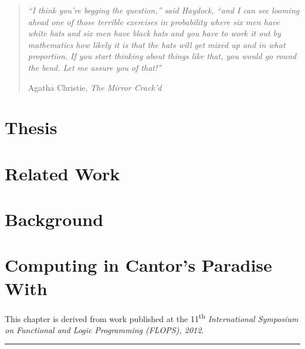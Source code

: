 \documentclass[phd,letterpaper,lof,chaptercenter,parttop,electronic]{byumsphd}
\title{\Title}
\author{\Author}
\begin{document}
\maketitle
{}

\vspace*{\fill}
\begin{quote}
\textit{``I think you're begging the question,'' said Haydock, ``and I can see looming ahead one of those terrible exercises in probability where six men have white hats and six men have black hats and you have to work it out by mathematics how likely it is that the hats will get mixed up and in what proportion. If you start thinking about things like that, you would go round the bend. Let me assure you of that!''}

\hfill Agatha Christie, \textit{The Mirror Crack'd}
\end{quote}
\vspace*{\fill}

\chapter{Thesis}



\chapter{Related Work}



\chapter{Background}
\label{ch:background}




\chapter{Computing in Cantor's Paradise With \lzfclang}
\label{ch:lambda-zfc}

This chapter is derived from work published at the 11\textsuperscript{th} \emph{International Symposium on Functional and Logic Programming (FLOPS), 2012}.

\vspace{\baselineskip}
\hrule
\vspace{\baselineskip}
\end{document}

